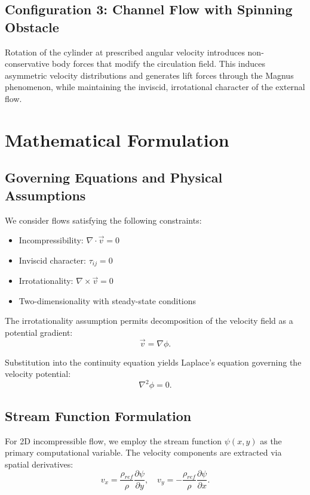 \subsection{Configuration 3: Channel Flow with Spinning Obstacle}

Rotation of the cylinder at prescribed angular velocity introduces non-conservative body forces that modify the circulation field. This induces asymmetric velocity distributions and generates lift forces through the Magnus phenomenon, while maintaining the inviscid, irrotational character of the external flow.

\section{Mathematical Formulation}

\subsection{Governing Equations and Physical Assumptions}

We consider flows satisfying the following constraints:
\begin{itemize}
    \item Incompressibility: $\nabla \cdot \vec{v} = 0$
    \item Inviscid character: $\tau_{ij} = 0$
    \item Irrotationality: $\nabla \times \vec{v} = 0$
    \item Two-dimensionality with steady-state conditions
\end{itemize}

The irrotationality assumption permits decomposition of the velocity field as a potential gradient:
\begin{equation}
\vec{v} = \nabla \phi.
\end{equation}

Substitution into the continuity equation yields Laplace's equation governing the velocity potential:
\begin{equation}
\nabla^2 \phi = 0.
\end{equation}

\subsection{Stream Function Formulation}

For 2D incompressible flow, we employ the stream function $\psi(x, y)$ as the primary computational variable. The velocity components are extracted via spatial derivatives:
\begin{equation}
v_x = \frac{\rho_{ref}}{\rho} \frac{\partial \psi}{\partial y}, \quad
v_y = -\frac{\rho_{ref}}{\rho} \frac{\partial \psi}{\partial x}.
\end{equation}

